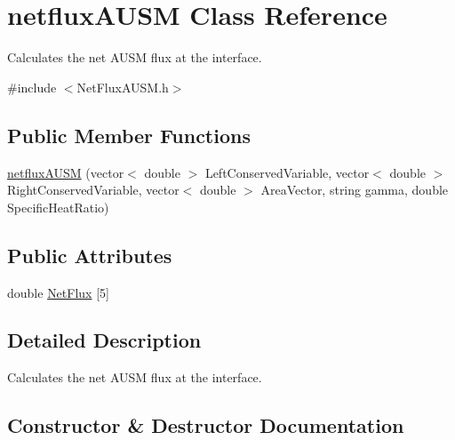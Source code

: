 \hypertarget{classnetfluxAUSM}{}\section{netflux\+A\+U\+SM Class Reference}
\label{classnetfluxAUSM}


Calculates the net A\+U\+SM flux at the interface.  




{\ttfamily \#include $<$Net\+Flux\+A\+U\+S\+M.\+h$>$}

\subsection*{Public Member Functions}
\begin{DoxyCompactItemize}
\item 
\hyperlink{classnetfluxAUSM_a68c53463497f0c6b3ba8cfc9af17b5cd}{netflux\+A\+U\+SM} (vector$<$ double $>$ Left\+Conserved\+Variable, vector$<$ double $>$ Right\+Conserved\+Variable, vector$<$ double $>$ Area\+Vector, string gamma, double Specific\+Heat\+Ratio)
\end{DoxyCompactItemize}
\subsection*{Public Attributes}
\begin{DoxyCompactItemize}
\item 
double \hyperlink{classnetfluxAUSM_a8fb78535709581ad1f781aff25e61ff9}{Net\+Flux} \mbox{[}5\mbox{]}
\end{DoxyCompactItemize}


\subsection{Detailed Description}
Calculates the net A\+U\+SM flux at the interface. 

\subsection{Constructor \& Destructor Documentation}

